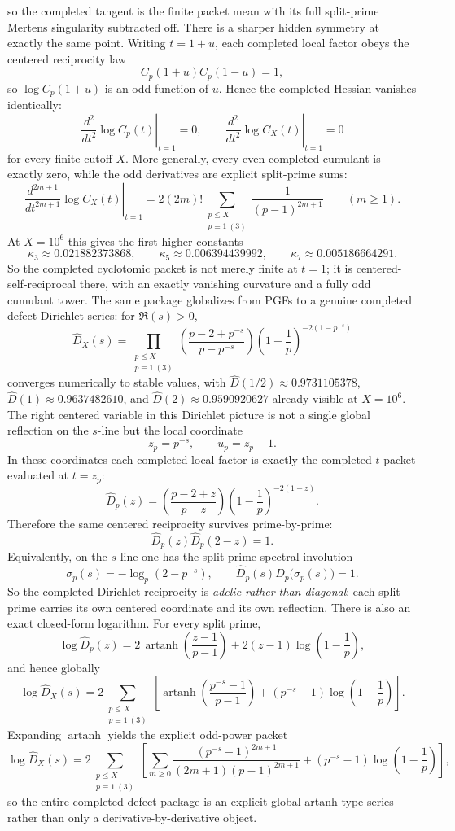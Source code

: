 \documentclass[12pt,a4paper]{article}
\def\mathcal#1{#1}%
\theoremstyle{definition}
\begin{document}
so the completed tangent is the finite packet mean with its full split-prime Mertens singularity subtracted off.
There is a sharper hidden symmetry at exactly the same point. Writing $t=1+u$, each completed local factor obeys the centered reciprocity law
\[
\mathcal C_p(1+u)\mathcal C_p(1-u)=1,
\]
so $\log\mathcal C_p(1+u)$ is an odd function of $u$. Hence the completed Hessian vanishes identically:
\[
\left.\frac{d^2}{dt^2}\log \mathcal C_p(t)\right|_{t=1}=0,
\qquad
\left.\frac{d^2}{dt^2}\log \mathcal C_X(t)\right|_{t=1}=0
\]
for every finite cutoff $X$. More generally, every even completed cumulant is exactly zero, while the odd derivatives are explicit split-prime sums:
\[
\left.\frac{d^{2m+1}}{dt^{2m+1}}\log \mathcal C_X(t)\right|_{t=1}
=2(2m)!\sum_{\substack{p\le X\\ p\equiv1\ (3)}}\frac{1}{(p-1)^{2m+1}}
\qquad (m\ge1).
\]
At $X=10^6$ this gives the first higher constants
\[
\kappa_3\approx0.021882373868,
\qquad
\kappa_5\approx0.006394439992,
\qquad
\kappa_7\approx0.005186664291.
\]
So the completed cyclotomic packet is not merely finite at $t=1$; it is centered-self-reciprocal there, with an exactly vanishing curvature and a fully odd cumulant tower.
The same package globalizes from PGFs to a genuine completed defect Dirichlet series: for $\Re(s)>0$,
\[
\widehat D_X(s)=\prod_{\substack{p\le X\\ p\equiv1\ (3)}}
\left(\frac{p-2+p^{-s}}{p-p^{-s}}\right)
\left(1-\frac1p\right)^{-2(1-p^{-s})}
\]
converges numerically to stable values, with $\widehat D(1/2)\approx0.9731105378$, $\widehat D(1)\approx0.9637482610$, and $\widehat D(2)\approx0.9590920627$ already visible at $X=10^6$.
The right centered variable in this Dirichlet picture is not a single global reflection on the $s$-line but the local coordinate
\[
z_p=p^{-s}, \qquad u_p=z_p-1.
\]
In these coordinates each completed local factor is exactly the completed $t$-packet evaluated at $t=z_p$:
\[
\widehat D_p(z)=\left(\frac{p-2+z}{p-z}\right)\left(1-\frac1p\right)^{-2(1-z)}.
\]
Therefore the same centered reciprocity survives prime-by-prime:
\[
\widehat D_p(z)\widehat D_p(2-z)=1.
\]
Equivalently, on the $s$-line one has the split-prime spectral involution
\[
\sigma_p(s)=-\log_p\!\left(2-p^{-s}\right),
\qquad
\widehat D_p(s)\widehat D_p\bigl(\sigma_p(s)\bigr)=1.
\]
So the completed Dirichlet reciprocity is \emph{adelic rather than diagonal}: each split prime carries its own centered coordinate and its own reflection.
There is also an exact closed-form logarithm. For every split prime,
\[
\log \widehat D_p(z)
=
2\,\operatorname{artanh}\!\left(\frac{z-1}{p-1}\right)
+2(z-1)\log\!\left(1-\frac1p\right),
\]
and hence globally
\[
\log \widehat D_X(s)=
2\sum_{\substack{p\le X\\ p\equiv1\ (3)}}
\left[
\operatorname{artanh}\!\left(\frac{p^{-s}-1}{p-1}\right)
+(p^{-s}-1)\log\!\left(1-\frac1p\right)
\right].
\]
Expanding $\operatorname{artanh}$ yields the explicit odd-power packet
\[
\log \widehat D_X(s)=
2\sum_{\substack{p\le X\\ p\equiv1\ (3)}}
\left[
\sum_{m\ge0}\frac{(p^{-s}-1)^{2m+1}}{(2m+1)(p-1)^{2m+1}}
+(p^{-s}-1)\log\!\left(1-\frac1p\right)
\right],
\]
so the entire completed defect package is an explicit global artanh-type series rather than only a derivative-by-derivative object.
\end{document}
